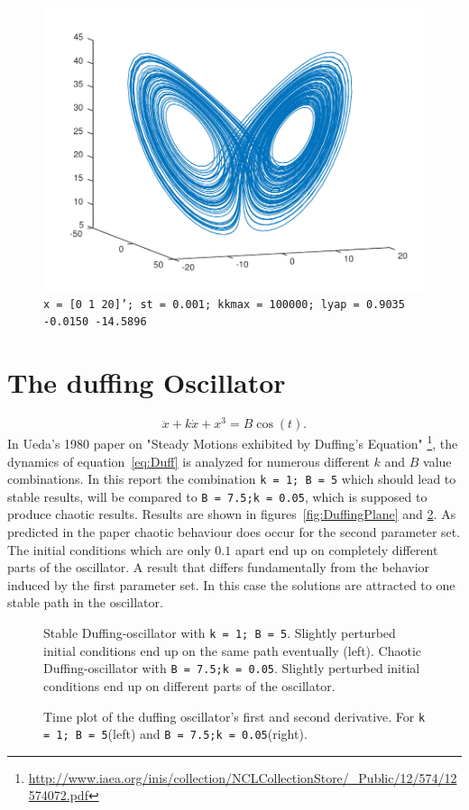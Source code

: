 \begin{figure}
\includegraphics[scale=0.5]{./plots/bestLorenz.pdf}
\caption{\texttt{x = [0 1 20]'; st = 0.001; kkmax = 100000; lyap = 0.9035   -0.0150  -14.5896}}
\label{fig:comp3}
\end{figure}

\section{The duffing Oscillator}
\begin{equation}
\ddot{x} + k\dot{x} + x^3 = B \cos(t).
\label{eq:Duff}
\end{equation}
In Ueda's 1980 paper on "Steady Motions exhibited by Duffing's Equation" \footnote{\url{http://www.iaea.org/inis/collection/NCLCollectionStore/_Public/12/574/12574072.pdf}}, the dynamics of equation~\ref{eq:Duff} is analyzed for numerous different $k$ and $B$ value combinations. In this report the combination \texttt{k = 1; B = 5}  which should lead to stable results, will be compared to \texttt{B = 7.5;k = 0.05}, which is supposed to produce chaotic results. Results are shown in figures~\ref{fig:DuffingPlane} and \ref{fig:DuffingTime}. As predicted in the paper chaotic behaviour does occur for the second parameter set. The initial conditions which are only $0.1$ apart end up on completely different parts of the oscillator. A result that differs fundamentally from the behavior induced by the first parameter set. In this case the solutions are attracted to one stable path in the oscillator.   

\begin{figure}


\caption{Stable Duffing-oscillator with \texttt{k = 1; B = 5}. Slightly perturbed initial conditions end up on the same path eventually (left). Chaotic Duffing-oscillator with \texttt{B = 7.5;k = 0.05}. Slightly perturbed initial conditions end up on different parts of the oscillator.}
\label{fig:DuffingPlane}


\caption{Time plot of the duffing oscillator's first and second derivative. For \texttt{k = 1; B = 5}(left) and \texttt{B = 7.5;k = 0.05}(right). }
\label{fig:DuffingTime}
\end{figure}


